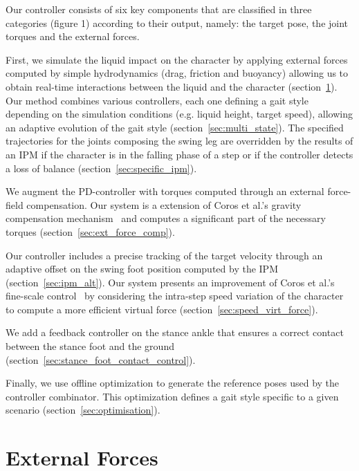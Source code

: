 \documentclass[runningheads,a4paper,10pt]{llncs}
\begin{document}
Our controller consists of six key components that are classified in three categories (figure 1) according to their output, namely: the target pose, the joint torques and the external forces.

First, we simulate the liquid impact on the character by applying external forces computed by simple hydrodynamics (drag, friction and buoyancy) allowing us to obtain real-time interactions between the liquid and the character (section~\ref{sec:ext_forces}). Our method combines various controllers, each one defining a gait style depending on the simulation conditions (e.g. liquid height, target speed), allowing an adaptive evolution of the gait style (section~\ref{sec:multi_state}). The specified trajectories for the joints composing the swing leg are overridden by the results of an IPM if the character is in the falling phase of a step or if the controller detects a loss of balance (section~\ref{sec:specific_ipm}).

We augment the PD-controller with torques computed through an external force-field compensation. Our system is a extension of Coros et al.'s gravity compensation mechanism~\citep{coros2010generalized} and computes a significant part of the necessary torques (section~\ref{sec:ext_force_comp}).

Our controller includes a precise tracking of the target velocity through an adaptive offset on the swing foot position computed by the IPM (section~\ref{sec:ipm_alt}). Our system presents an improvement of Coros et al.'s fine-scale control~\citep{coros2010generalized} by considering the intra-step speed variation of the character to compute a more efficient virtual force (section~\ref{sec:speed_virt_force}).

We add a feedback controller on the stance ankle that ensures a correct contact between the stance foot and the ground (section~\ref{sec:stance_foot_contact_control}).

Finally, we use offline optimization to generate the reference poses used by the controller combinator. This optimization defines a gait style specific to a given scenario (section~\ref{sec:optimisation}).

\section{External Forces}
\label{sec:ext_forces}
\end{document}
